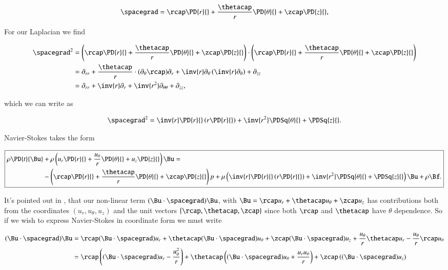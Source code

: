 \begin{equation}\label{eqn:classicalMechanicsPs2:610}
\spacegrad =
\rcap \PD{r}{} +
\frac{\thetacap}{r} \PD{\theta}{} +
\zcap \PD{z}{},
\end{equation}

For our Laplacian we find

\begin{align*}
\spacegrad^2 &=
\left(
\rcap \PD{r}{} +
\frac{\thetacap}{r} \PD{\theta}{} +
\zcap \PD{z}{}
\right)
 \cdot
\left(
\rcap \PD{r}{} +
\frac{\thetacap}{r} \PD{\theta}{} +
\zcap \PD{z}{}
\right) \\
&=
\partial_{rr}
+ \frac{\thetacap}{r} \cdot (\partial_\theta \rcap) \partial_r
+ \inv{r} \partial_\theta \left( \inv{r} \partial_\theta \right)
+ \partial_{zz} \\
&=
\partial_{rr} + \inv{r} \partial_r + \inv{r^2} \partial_{\theta\theta} + \partial_{zz},
\end{align*}

which we can write as

\begin{equation}\label{eqn:continuumL12:630}
\spacegrad^2 = \inv{r} \PD{r}{} \left( r \PD{r}{} \right) + \inv{r^2} \PDSq{\theta}{} + \PDSq{z}{}.
\end{equation}

Navier-Stokes takes the form

\begin{equation}\label{eqn:classicalMechanicsPs2:650}
\boxed{
\begin{aligned}
\rho \PD{t}{\Bu} &+ \rho
\left(
u_r \PD{r}{} +
\frac{u_\theta}{r} \PD{\theta}{} +
u_z \PD{z}{} \right) \Bu
=  \\
&-
\left(
\rcap \PD{r}{} +
\frac{\thetacap}{r} \PD{\theta}{} +
\zcap \PD{z}{}
\right)
p + \mu \left(
\inv{r} \PD{r}{} \left( r \PD{r}{} \right) + \inv{r^2} \PDSq{\theta}{} + \PDSq{z}{} \right)
\Bu + \rho \Bf.
\end{aligned}
}
\end{equation}

It's pointed out in \cite{acheson1990elementary}, that our non-linear term $(\Bu \cdot \spacegrad) \Bu$, with $\Bu = \rcap u_r + \thetacap u_\theta + \zcap u_z$ has contributions both from the coordinates $(u_r, u_\theta, u_z)$ and the unit vectors $\{\rcap, \thetacap, \zcap\}$ since both $\rcap$ and $\thetacap$ have $\theta$ dependence.  So if we wish to express Navier-Stokes in coordinate form we must write

\begin{equation}\label{eqn:classicalMechanicsPs2:650b}
\begin{aligned}
(\Bu \cdot \spacegrad) \Bu
&=
\rcap (\Bu \cdot \spacegrad) u_r 
+\thetacap (\Bu \cdot \spacegrad) u_\theta
+\zcap (\Bu \cdot \spacegrad) u_z
+ \frac{u_\theta}{r} \thetacap u_r
- \frac{u_\theta}{r} \rcap u_\theta \\
&=
\rcap \left((\Bu \cdot \spacegrad) u_r 
- \frac{u_\theta^2}{r} 
\right)
+\thetacap \left((\Bu \cdot \spacegrad) u_\theta
+ \frac{u_r u_\theta}{r} 
\right)
+\zcap \left((\Bu \cdot \spacegrad) u_z\right)
\end{aligned}
\end{equation}

